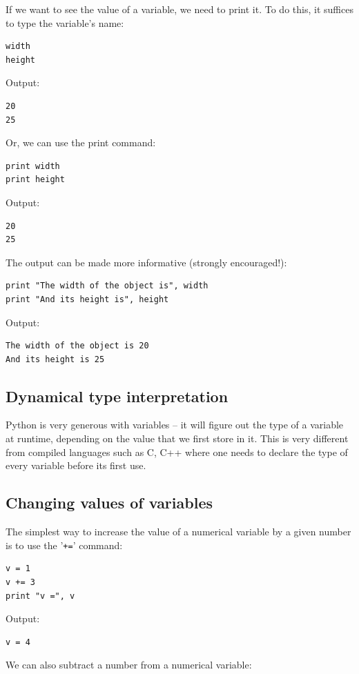 If we want to see the value of a variable, we need to print it.
To do this, it suffices to type the variable's name:

\begin{verbatim}
width
height
\end{verbatim}
Output:

\begin{verbatim}
20
25
\end{verbatim}
Or, we can use the print command:

\begin{verbatim}
print width
print height
\end{verbatim}
Output:

\begin{verbatim}
20
25
\end{verbatim}
The output can be made more informative (strongly encouraged!):

\begin{verbatim}
print "The width of the object is", width
print "And its height is", height
\end{verbatim}
Output:

\begin{verbatim}
The width of the object is 20
And its height is 25
\end{verbatim}

\subsection{Dynamical type interpretation}

Python is very generous with variables -- it will figure out the type of a variable 
at runtime, depending on the value that we first store in it. This is very different 
from compiled languages such as C, C++ where one needs to declare the type of every variable 
before its first use. 

\subsection{Changing values of variables}

The simplest way to increase the value of a numerical variable by a given number is to use the '{\tt +=}' 
command:

\begin{verbatim}
v = 1
v += 3
print "v =", v
\end{verbatim}
Output:

\begin{verbatim}
v = 4
\end{verbatim}
We can also subtract a number from a numerical variable:

